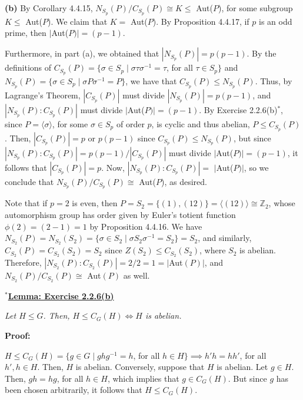 \textbf{(b)} 
By Corollary 4.4.15, $N_{S_p}(P)/C_{S_p}(P) \cong K \le$ Aut($P$), for some subgroup $K \le$ Aut($P$). We claim that $K =$ Aut($P$). By Proposition 4.4.17, if $p$ is an odd prime, then $|$Aut($P)| = (p-1)$. 

Furthermore, in part (a), we obtained that $|N_{S_p}(P)| = p(p-1)$. By the definitions of $C_{S_p}(P) = \{\sigma \in S_p \mid \sigma\tau\sigma^{-1} = \tau$, for all $\tau \in S_p\}$ and $N_{S_p}(P) = \{\sigma \in S_p \mid \sigma P \sigma^{-1} = P\}$, we have that $C_{S_p}(P) \le N_{S_p}(P)$. Thus, by Lagrange's Theorem, $|C_{S_p}(P)|$ must divide $|N_{S_p}(P)| = p(p-1)$, and $|N_{S_p}(P):C_{S_p}(P)|$ must divide $|$Aut($P)| = (p-1)$. By Exercise 2.2.6(b)$^*$, since $P = \langle \sigma \rangle$, for some $\sigma \in S_p$ of order $p$, is cyclic and thus abelian, $P \le C_{S_p}(P)$. Then, $|C_{S_p}(P)| = p$ or $p(p-1)$ since $C_{S_p}(P) \le N_{S_p}(P)$, but since $|N_{S_p}(P):C_{S_p}(P)| = p(p-1)/|C_{S_p}(P)|$ must divide $|$Aut($P)| = (p-1)$, it follows that $|C_{S_p}(P)| = p$. Now, $|N_{S_p}(P):C_{S_p}(P)| =$ $|$Aut($P)|$, so we conclude that $N_{S_p}(P)/C_{S_p}(P) \cong$ Aut($P$), as desired.

Note that if $p = 2$ is even, then $P = S_2 = \{(1),(12)\} = \langle (12) \rangle \cong \mathbb{Z}_2$, whose automorphism group has order given by Euler's totient function $\phi(2) = (2-1) = 1$ by Proposition 4.4.16. We have $N_{S_2}(P) = N_{S_2}(S_2) = \{\sigma \in S_2 \mid \sigma S_2 \sigma^{-1} = S_2\} = S_2$, and similarly, $C_{S_2}(P) = C_{S_2}(S_2) = S_2$ since $Z(S_2) \le C_{S_2}(S_2)$, where $S_2$ is abelian. Therefore, $|N_{S_2}(P):C_{S_2}(P)| = 2/2 = 1 = |$Aut$(P)|$, and $N_{S_2}(P)/C_{S_2}(P) \cong$ Aut$(P)$ as well.

\vspace{5mm}
\underline{\textbf{$^*$Lemma: Exercise 2.2.6(b)}}

\textit{Let $H \le G$. Then, $H \le C_G(H) \iff H$ is abelian.}

\textbf{Proof:}

$H \le C_G(H) = \{g\in G\mid ghg^{-1} = h$, for all $h \in H\} \implies h'h = hh'$, for all $h',h \in H$. Then, $H$ is abelian. Conversely, suppose that $H$ is abelian. Let $g \in H$. Then, $gh = hg$, for all $h \in H$, which implies that $g \in C_G(H)$. But since $g$ has been chosen arbitrarily, it follows that $H \le C_G(H)$.